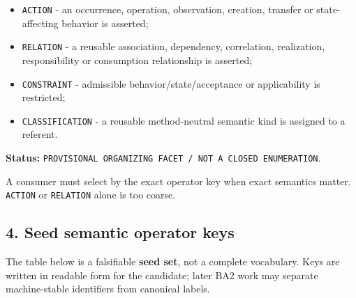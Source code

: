 \documentclass[
  10pt,
  letterpaper,
]{article}
\providecommand{\tightlist}{%
  \setlength{\itemsep}{0pt}\setlength{\parskip}{0pt}}
\begin{document}
\begin{itemize}
\tightlist
\item
  \texttt{ACTION} - an occurrence, operation, observation, creation,
  transfer or state-affecting behavior is asserted;
\item
  \texttt{RELATION} - a reusable association, dependency, correlation,
  realization, responsibility or consumption relationship is asserted;
\item
  \texttt{CONSTRAINT} - admissible behavior/state/acceptance or
  applicability is restricted;
\item
  \texttt{CLASSIFICATION} - a reusable method-neutral semantic kind is
  assigned to a referent.
\end{itemize}

\textbf{Status:}
\texttt{PROVISIONAL\ ORGANIZING\ FACET\ /\ NOT\ A\ CLOSED\ ENUMERATION}.

A consumer must select by the exact operator key when exact semantics
matter. \texttt{ACTION} or \texttt{RELATION} alone is too coarse.

\subsection{4. Seed semantic operator
keys}\label{seed-semantic-operator-keys}

The table below is a falsifiable \textbf{seed set}, not a complete
vocabulary. Keys are written in readable form for the candidate; later
BA2 work may separate machine-stable identifiers from canonical labels.
\end{document}
